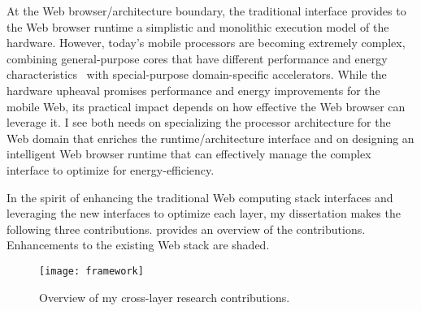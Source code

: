 At the Web browser/architecture boundary, the traditional interface provides to the Web browser runtime a simplistic and monolithic execution model of the hardware. However, today's mobile processors are becoming extremely complex, combining general-purpose cores that have different performance and energy characteristics~\cite{single-ISA} with special-purpose domain-specific accelerators. While the hardware upheaval promises performance and energy improvements for the mobile Web, its practical impact depends on how effective the Web browser can leverage it. I see both needs on specializing the processor architecture for the Web domain that enriches the runtime/architecture interface and on designing an intelligent Web browser runtime that can effectively manage the complex interface to optimize for energy-efficiency.

In the spirit of enhancing the traditional Web computing stack interfaces and leveraging the new interfaces to optimize each layer, my dissertation makes the following three contributions.  provides an overview of the contributions. Enhancements to the existing Web stack are shaded.

\begin{sidewaysfigure}
    \centering
    \texttt{[image: framework]}
    \caption{Overview of my cross-layer research contributions.}
    \label{fig:framework}
\end{sidewaysfigure}

